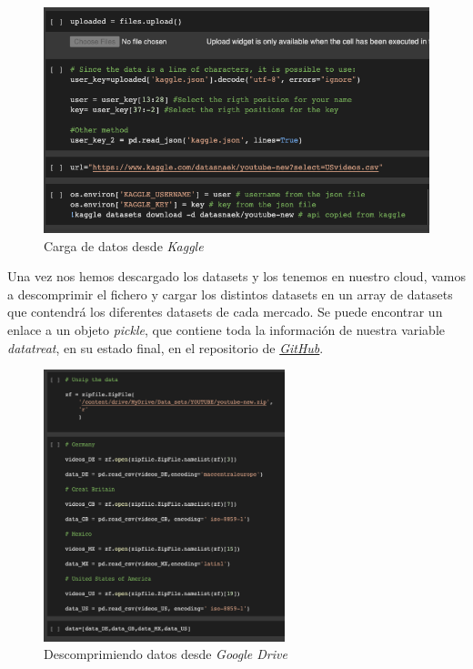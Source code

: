 \documentclass[a4paper,12pt]{article}
\begin{document}
\begin{figure}[h!]
 \centering
\includegraphics[width=13cm]{kaggle_upload.png}
\caption{Carga de datos desde {\itshape Kaggle}}
\label{fig:carga}
\end{figure}


Una vez nos hemos descargado los datasets y los tenemos en nuestro cloud, vamos a descomprimir el fichero y cargar los distintos datasets en un array de datasets que contendr\'a los diferentes datasets de cada mercado. Se puede encontrar un enlace a un objeto {\itshape pickle}, que contiene toda la informaci\'on de nuestra variable {\itshape data{\textunderscore}treat}, en su estado final, en el repositorio de \href{https://github.com/b-suarez/youtube_stats_analysis/blob/main/Pickle_and_other_data/data_and\%20objects.txt}{{\itshape GitHub}}.


\begin{figure}[h!]
\centering
\includegraphics[width=7cm]{data_load.png}
\caption{Descomprimiendo datos desde {\itshape Google Drive}}
\label{fig:desc}
\end{figure}
\end{document}
